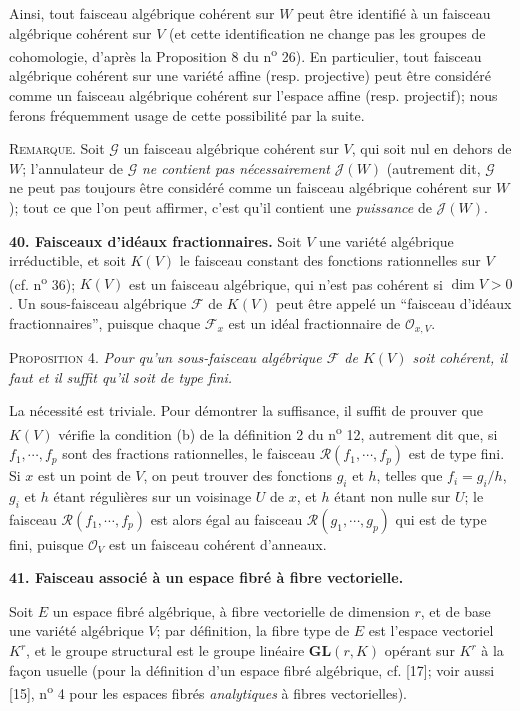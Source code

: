 Ainsi, tout faisceau algébrique cohérent sur $W$ peut être identifié à un faisceau algébrique cohérent sur $V$ (et cette identification ne change pas les groupes de cohomologie, d'après la Proposition 8 du n\textsuperscript{o} 26). En particulier, tout faisceau algébrique cohérent sur une variété affine (resp. projective) peut être considéré comme un faisceau algébrique cohérent sur l'espace affine (resp. projectif); nous ferons fréquemment usage de cette possibilité par la suite.

\textsc{Remarque}. Soit $\mathcal{G}$ un faisceau algébrique cohérent sur $V$, qui soit nul en dehors de $W$; l'annulateur de $\mathcal{G}$ \textit{ne contient pas nécessairement} $\mathcal{J}(W)$ (autrement dit, $\mathcal{G}$ ne peut pas toujours être considéré comme un faisceau algébrique cohérent sur $W$); tout ce que l'on peut affirmer, c'est qu'il contient une \textit{puissance} de $\mathcal{J}(W)$.

\textbf{40. Faisceaux d'idéaux fractionnaires.} Soit $V$ une variété algébrique irréductible, et soit $K(V)$ le faisceau constant des fonctions rationnelles sur $V$ (cf. n\textsuperscript{o} 36); $K(V)$ est un faisceau algébrique, qui n'est pas cohérent si $\dim V > 0$. Un sous-faisceau algébrique $\mathcal{F}$ de $K(V)$ peut être appelé un ``faisceau d'idéaux fractionnaires'', puisque chaque $\mathcal{F}_x$ est un idéal fractionnaire de $\mathcal{O}_{x,V}$.

\textsc{Proposition} 4. \textit{Pour qu'un sous-faisceau algébrique $\mathcal{F}$ de $K(V)$ soit cohérent, il faut et il suffit qu'il soit de type fini.}

La nécessité est triviale. Pour démontrer la suffisance, il suffit de prouver que $K(V)$ vérifie la condition (b) de la définition 2 du n\textsuperscript{o} 12, autrement dit que, si $f_1, \cdots, f_p$ sont des fractions rationnelles, le faisceau $\mathcal{R}(f_1, \cdots, f_p)$ est de type fini. Si $x$ est un point de $V$, on peut trouver des fonctions $g_i$ et $h$, telles que $f_i = g_i/h$, $g_i$ et $h$ étant régulières sur un voisinage $U$ de $x$, et $h$ étant non nulle
sur $U$; le faisceau $\mathcal{R}(f_1, \cdots, f_p)$ est alors égal au faisceau $\mathcal{R}(g_1, \cdots, g_p)$ qui est de type fini, puisque $\mathcal{O}_V$ est un faisceau cohérent d'anneaux.


\textbf{41. Faisceau associé à un espace fibré à fibre vectorielle.}

Soit $E$ un espace fibré algébrique, à fibre vectorielle de dimension $r$, et de base une variété algébrique $V$; par définition, la fibre type de $E$ est l'espace vectoriel $K^r$, et le groupe structural est le groupe linéaire $\mathbf{GL}(r, K)$ opérant sur $K^r$ à la façon usuelle (pour la définition d'un espace fibré algébrique, cf. [17]; voir aussi [15], n\textsuperscript{o} 4 pour les espaces fibrés \textit{analytiques} à fibres vectorielles).


